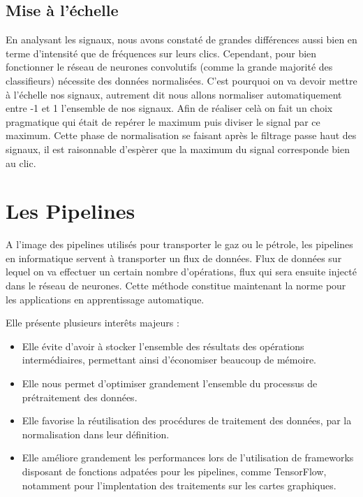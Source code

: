 \hypertarget{Mise-a-l-echelle}{%
\subsection{Mise à l'échelle}
\label{Mise-a-l-echelle}}

En analysant les signaux, nous avons constaté de grandes différences aussi bien en terme d'intensité que de fréquences sur leurs clics.
Cependant, pour bien fonctionner le réseau de neurones convolutifs (comme la grande majorité des classifieurs) nécessite des données normalisées.
C'est pourquoi on va devoir mettre à l'échelle nos signaux, autrement dit nous allons normaliser automatiquement entre -1 et 1 l'ensemble de nos signaux.
Afin de réaliser celà on fait un choix pragmatique qui était de repérer le maximum puis diviser le signal par ce maximum.
Cette phase de normalisation se faisant après le filtrage passe haut des signaux,
il est raisonnable d'espèrer que la maximum du signal corresponde bien au clic.

\hypertarget{Les-Pipelines}{%
\section{Les Pipelines}
\label{Les-Pipelines}}

A l'image des pipelines utilisés pour transporter le gaz ou le pétrole,
les pipelines en informatique servent à transporter un flux de données.
Flux de données sur lequel on va effectuer un certain nombre d'opérations, flux qui sera ensuite injecté  dans le réseau de neurones.
Cette méthode constitue maintenant la norme pour les applications en apprentissage automatique.

Elle présente plusieurs interêts majeurs :
\begin{itemize}
\item Elle évite d'avoir à stocker l'ensemble des résultats des opérations intermédiaires, permettant ainsi d'économiser beaucoup de mémoire.
\item Elle nous permet d'optimiser grandement l'ensemble du processus de prétraitement des données.
\item Elle favorise la réutilisation des procédures de traitement des données, par la normalisation dans leur définition.
\item Elle améliore grandement les performances lors de l'utilisation de frameworks disposant de fonctions adpatées pour les pipelines, comme TensorFlow, notamment pour l'implentation des traitements sur les cartes graphiques.
\end{itemize}

